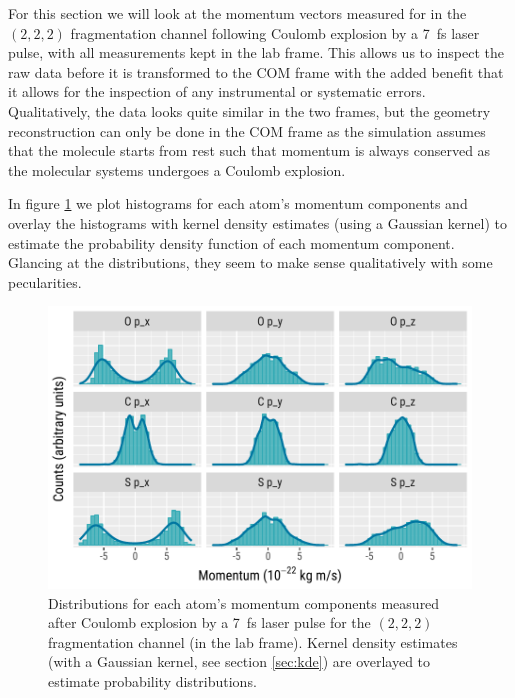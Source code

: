 For this section we will look at the momentum vectors measured for  in the $(2,2,2)$ fragmentation channel following Coulomb explosion by a \SI{7}{\fs} laser pulse, with all measurements kept in the lab frame. This allows us to inspect the raw data before it is transformed to the COM frame with the added benefit that it allows for the inspection of any instrumental or systematic errors. Qualitatively, the data looks quite similar in the two frames, but the geometry reconstruction can only be done in the COM frame as the simulation assumes that the molecule starts from rest such that momentum is always conserved as the molecular systems undergoes a Coulomb explosion.

In figure \ref{fig:OCS2227fsMomentum} we plot histograms for each atom's momentum components and overlay the histograms with kernel density estimates (using a Gaussian kernel) to estimate the probability density function of each momentum component. Glancing at the distributions, they seem to make sense qualitatively with some pecularities. 

\begin{figure}
  \centering
  \includegraphics[width=\textwidth]{Plots/OCS2227fsMomentum}
  \caption[Distributions for each atom's momentum components measured after Coulomb explosion by a \SI{7}{\fs} laser pulse for the $(2,2,2)$ fragmentation channel (in the lab frame).]
  {Distributions for each atom's momentum components measured after Coulomb explosion by a \SI{7}{\fs} laser pulse for the $(2,2,2)$ fragmentation channel (in the lab frame). Kernel density estimates (with a Gaussian kernel, see section \ref{sec:kde}) are overlayed to estimate probability distributions.}
  \label{fig:OCS2227fsMomentum}
\end{figure}

